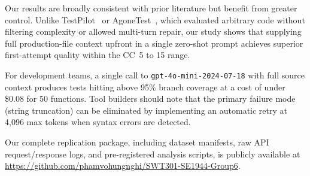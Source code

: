 \documentclass[conference]{IEEEtran}
\begin{document}
Our results are broadly consistent with prior literature but benefit from greater control. Unlike TestPilot~\cite{schafer2024testpilot} or AgoneTest~\cite{lops2025agonetest}, which evaluated arbitrary code without filtering complexity or allowed multi-turn repair, our study shows that supplying full production-file context upfront in a single zero-shot prompt achieves superior first-attempt quality within the CC~5 to 15 range.

For development teams, a single call to \texttt{gpt-4o-mini-2024-07-18} with full source context produces tests hitting above 95\% branch coverage at a cost of under \$0.08 for 50 functions. Tool builders should note that the primary failure mode (string truncation) can be eliminated by implementing an automatic retry at 4,096 max tokens when syntax errors are detected.

Our complete replication package, including dataset manifests, raw API request/response logs, and pre-registered analysis scripts, is publicly available at \url{https://github.com/phamvohungnghi/SWT301-SE1944-Group6}.




\end{document}
